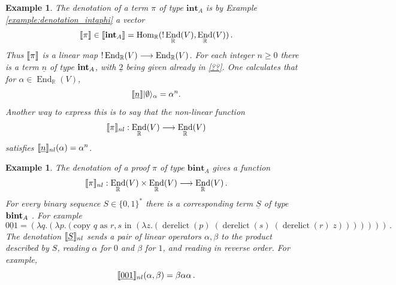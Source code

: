\documentclass[english,letter paper,12pt,leqno]{article}
\theoremstyle{example}
\newtheorem{example}[theorem]{Example}
\numberwithin{equation}{section}
\def\Hom{\operatorname{Hom}}
\DeclareMathOperator{\End}{End}
\DeclareMathOperator{\derelict}{derelict}
\begin{document}

\begin{example}\label{example_1} The denotation of a term $\pi$ of type $\textbf{int}_A$ is by Example \ref{example:denotation_intaphi} a vector
\[
\den{\pi} \in \den{\inta_A} = \Hom_{\mathbb{R}}( {!} \End_{\mathbb{R}}(V), \End_{\mathbb{R}}(V))\,.
\]
Thus $\llbracket \pi \rrbracket$ is a linear map ${!} \End_{\mathbb{R}}(V) \lto \End_{\mathbb{R}}(V)$. For each integer $n \ge 0$ there is a term $\underline{n}$ of type $\textbf{int}_A$, with $\underline{2}$ being given already in \eqref{??}. One calculates that for $\alpha \in \End_{\mathbb{R}}(V)$,
\[
\llbracket \underline{n} \rrbracket \lvert\emptyset\rangle_\alpha = \alpha^n.
\]
Another way to express this is to say that the non-linear function
\[
\den{\pi}_{nl}: \End_{\mathbb{R}}(V) \lto \End_{\mathbb{R}}(V)
\]
satisfies $\llbracket \underline{n} \rrbracket_{nl}(\alpha) = \alpha^n$. %
\end{example}

\begin{example}\label{example_2} The denotation of a proof $\pi$ of type $\textbf{bint}_A$ gives a function
\[
\den{\pi}_{nl}: \End_{\mathbb{R}}(V) \times \End_{\mathbb{R}}(V) \lto \End_{\mathbb{R}}(V)\,.
\]
For every binary sequence $S \in \{0,1\}^*$ there is a corresponding term $\underline{S}$ of type $\textbf{bint}_A$ \cite[\S 3.2]{murfetclift}. For example
\[
\underline{001} = (\lambda q.(\lambda p.(\textrm{copy $q$ as $r,s$ in } (\lambda z.(\derelict(p)\;(\derelict(s)\;(\derelict(r)\;z)))))))\,.
\]
The denotation $\llbracket \underline{S} \rrbracket_{nl}$ sends a pair of linear operators $\alpha,\beta$ to the product described by $S$, reading $\alpha$ for $0$ and $\beta$ for $1$, and reading in reverse order. For example,
\[
\llbracket \underline{001} \rrbracket_{nl}(\alpha,\beta) = \beta \alpha \alpha\,.
\]
\end{example}
\end{document}
